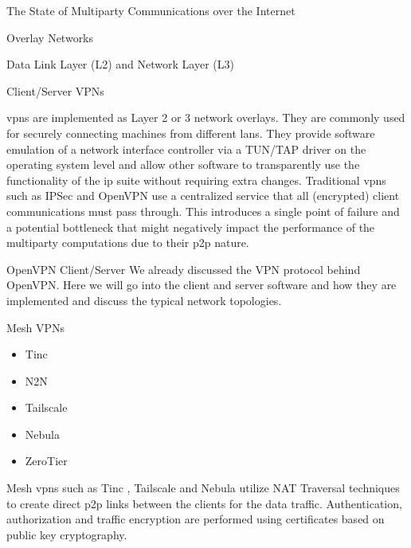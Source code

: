 \begin{frame}[fragile]{The State of Multiparty Communications over the
Internet}
\begin{block}{Overlay Networks}
\begin{block}{Data Link Layer (L2) and Network Layer (L3)}
\begin{block}{Client/Server VPNs}
\begin{itemize}
\begin{itemize}
    \glspl{vpn} are implemented as Layer 2 or 3 network overlays. They
    are commonly used for securely connecting machines from different
    \glspl{lan}. They provide software emulation of a network interface
    controller via a TUN/TAP driver on the operating system level and
    allow other software to transparently use the functionality of the
    \gls{ip} suite without requiring extra changes. Traditional
    \glspl{vpn} such as IPSec \autocite{ipSecRFC} and OpenVPN
    \autocite{openVPNDocs} use a centralized service that all
    (encrypted) client communications must pass through. This introduces
    a single point of failure and a potential bottleneck that might
    negatively impact the performance of the multiparty computations due
    to their \gls{p2p} nature.
  \end{itemize}
\end{itemize}

\begin{block}{OpenVPN Client/Server}
\protect\hypertarget{openvpn-clientserver}{}
We already discussed the VPN protocol behind OpenVPN. Here we will go
into the client and server software and how they are implemented and
discuss the typical network topologies.
\end{block}
\end{block}

\begin{block}{Mesh VPNs}
\protect\hypertarget{mesh-vpns}{}
\begin{itemize}
\tightlist
\item
  Tinc
\item
  N2N
\item
  Tailscale
\item
  Nebula
\item
  ZeroTier
\end{itemize}

Mesh \glspl{vpn} such as Tinc \autocite{tincDocs}, Tailscale
\autocite{tailscaleDocs} and Nebula \autocite{nebulaDocs} utilize NAT
Traversal techniques to create direct \gls{p2p} links between the
clients for the data traffic. Authentication, authorization and traffic
encryption are performed using certificates based on public key
cryptography.


\end{block}
\end{block}
\end{block}
\end{frame}
